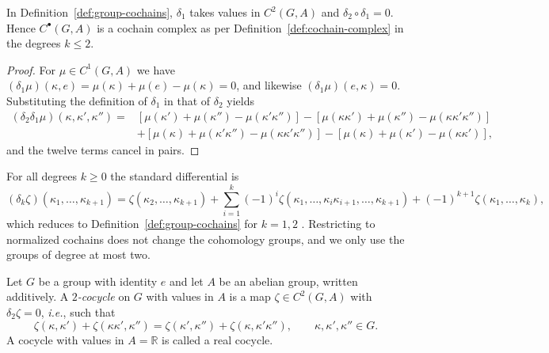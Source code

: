 \begin{proposition}\label{prop:group-complex}
	In Definition~\ref{def:group-cochains}, $\delta_1$ takes values in $C^2(G,A)$ and $\delta_2\circ\delta_1=0$. Hence $C^\bullet(G,A)$ is a cochain complex as per Definition~\ref{def:cochain-complex} in the degrees $k\leq2$.
\end{proposition}

\begin{proof}
	For $\mu\in C^1(G,A)$ we have $(\delta_1\mu)(\kappa,e)=\mu(\kappa)+\mu(e)-\mu(\kappa)=0$, and likewise $(\delta_1\mu)(e,\kappa)=0$. Substituting the definition of $\delta_1$ in that of $\delta_2$ yields
	\begin{align*}
		(\delta_2\delta_1\mu)(\kappa,\kappa',\kappa'')={}&[\mu(\kappa')+\mu(\kappa'')-\mu(\kappa'\kappa'')]-[\mu(\kappa\kappa')+\mu(\kappa'')-\mu(\kappa\kappa'\kappa'')]\\
		&+[\mu(\kappa)+\mu(\kappa'\kappa'')-\mu(\kappa\kappa'\kappa'')]-[\mu(\kappa)+\mu(\kappa')-\mu(\kappa\kappa')],
	\end{align*}
	and the twelve terms cancel in pairs.
\end{proof}

\begin{remark}\label{rem:group-general}
	For all degrees $k\geq0$ the standard differential is
	\begin{equation*}
		(\delta_k\zeta)(\kappa_1,\dots,\kappa_{k+1})=\zeta(\kappa_2,\dots,\kappa_{k+1})+\sum_{i=1}^k(-1)^i\zeta(\kappa_1,\dots,\kappa_i\kappa_{i+1},\dots,\kappa_{k+1})+(-1)^{k+1}\zeta(\kappa_1,\dots,\kappa_k),
	\end{equation*}
	which reduces to Definition~\ref{def:group-cochains} for $k=1,2$ \cite[TODO-location]{TODO-GroupCohomology}. Restricting to normalized cochains does not change the cohomology groups, and we only use the groups of degree at most two.
\end{remark}

\begin{definition}[Cocycle]\label{def:cocycle}
	Let $G$ be a group with identity $e$ and let $A$ be an abelian group, written additively. A \emph{$2$-cocycle} on $G$ with values in $A$ is a map $\zeta\in C^2(G,A)$ with $\delta_2\zeta=0$, \textit{i.e.}, such that
	\begin{equation*}
		\zeta(\kappa,\kappa')+\zeta(\kappa\kappa',\kappa'')=\zeta(\kappa',\kappa'')+\zeta(\kappa,\kappa'\kappa''), \qquad \kappa,\kappa',\kappa''\in G.
	\end{equation*}
	A cocycle with values in $A=\mathbb{R}$ is called a real cocycle.
\end{definition}

